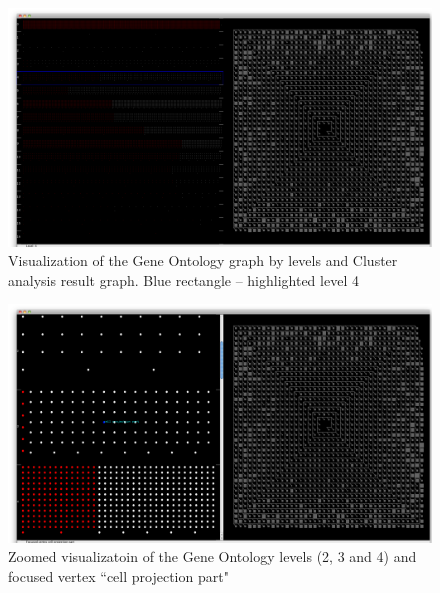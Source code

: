 \label{sec:appendix_D}

\begin{figure}[h!]
\centering
\includegraphics[scale=0.33, angle=90]{pictures/screenshot_1.png}
\caption{Visualization of the Gene Ontology graph by levels and Cluster analysis result graph. Blue rectangle -- highlighted level 4}
\end{figure}

\newpage
\begin{figure}[h!]
\centering
\includegraphics[scale=0.33, angle=90]{pictures/screenshot_2.png}
\caption{Zoomed visualizatoin of the Gene Ontology levels (2, 3 and 4) and focused vertex ``cell projection part"}
\end{figure}

